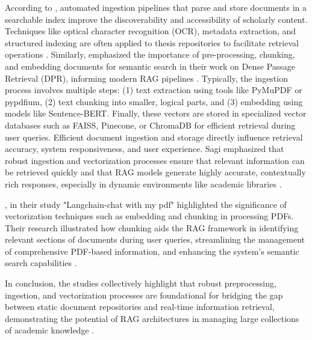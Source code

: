 \begin{refsection}
\bigbreak
\hspace{0.4cm}According to \citeauthor{zhang2023automated} \citeyear{zhang2023automated}, automated ingestion pipelines that parse and store documents in a searchable index improve the discoverability and accessibility of scholarly content. Techniques like optical character recognition (OCR), metadata extraction, and structured indexing are often applied to thesis repositories to facilitate retrieval operations \cite{zhang2023automated}. Similarly, \citeauthor{karpukhin2020dense} \citeyear{karpukhin2020dense} emphasized the importance of pre-processing, chunking, and embedding documents for semantic search in their work on Dense Passage Retrieval (DPR), informing modern RAG pipelines \cite{karpukhin2020dense}. Typically, the ingestion process involves multiple steps: (1) text extraction using tools like PyMuPDF or pypdfium, (2) text chunking into smaller, logical parts, and (3) embedding using models like Sentence-BERT. Finally, these vectors are stored in specialized vector databases such as FAISS, Pinecone, or ChromaDB for efficient retrieval during user queries. Efficient document ingestion and storage directly influence retrieval accuracy, system responsiveness, and user experience. Sagi emphasized that robust ingestion and vectorization processes ensure that relevant information can be retrieved quickly and that RAG models generate highly accurate, contextually rich responses, especially in dynamic environments like academic libraries \cite{karpukhin2020dense}.

\bigbreak
\hspace{0.4cm}\citeauthor{deepak2025langchain} \citeyear{deepak2025langchain}, in their study "Langchain-chat with my pdf" highlighted the significance of vectorization techniques such as embedding and chunking in processing PDFs. Their research illustrated how chunking aids the RAG framework in identifying relevant sections of documents during user queries, streamlining the management of comprehensive PDF-based information, and enhancing the system's semantic search capabilities \cite{deepak2025langchain}.

\bigbreak
\hspace{0.4cm}In conclusion, the studies collectively highlight that robust preprocessing, ingestion, and vectorization processes are foundational for bridging the gap between static document repositories and real-time information retrieval, demonstrating the potential of RAG architectures in managing large collections of academic knowledge \cite{allu2024beyond} \cite{aquino2024extracting}.



\end{refsection}
